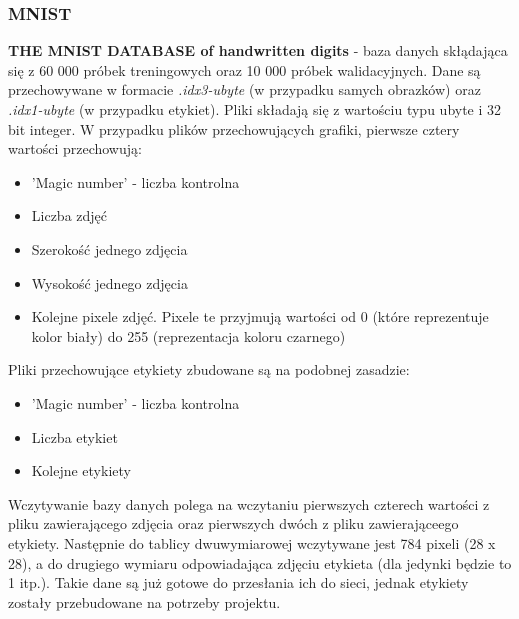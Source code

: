 \documentclass[12pt,a4paper]{article}
\begin{document}
	\subsubsection*{MNIST}
	\textbf{THE MNIST DATABASE of handwritten digits} - baza danych skłądająca się z 60 000 próbek treningowych oraz 10 000 próbek walidacyjnych. Dane są przechowywane w formacie \textit{.idx3-ubyte} (w przypadku samych obrazków) oraz \textit{.idx1-ubyte} (w przypadku etykiet). Pliki składają się z wartościu typu ubyte i 32 bit integer. W przypadku plików przechowujących grafiki, pierwsze cztery wartości przechowują:
	\begin{itemize}
	\item 'Magic number' - liczba kontrolna
	\item Liczba zdjęć
	\item Szerokość jednego zdjęcia
	\item Wysokość jednego zdjęcia
	\item Kolejne pixele zdjęć. Pixele te przyjmują wartości od 0 (które reprezentuje kolor biały) do 255 (reprezentacja koloru czarnego)
	\end{itemize}
	
	Pliki przechowujące etykiety zbudowane są na podobnej zasadzie:
	\begin{itemize}
	\item 'Magic number' - liczba kontrolna
	\item Liczba etykiet
	\item Kolejne etykiety
	\end{itemize}
	
	Wczytywanie bazy danych polega na wczytaniu pierwszych czterech wartości z pliku zawierającego zdjęcia oraz pierwszych dwóch z pliku zawierająceego etykiety. Następnie do tablicy dwuwymiarowej wczytywane jest 784 pixeli (28 x 28), a do drugiego wymiaru odpowiadająca zdjęciu etykieta (dla jedynki będzie to 1 itp.). Takie dane są już gotowe do przesłania ich do sieci, jednak etykiety zostały przebudowane na potrzeby projektu.
	
\end{document}
